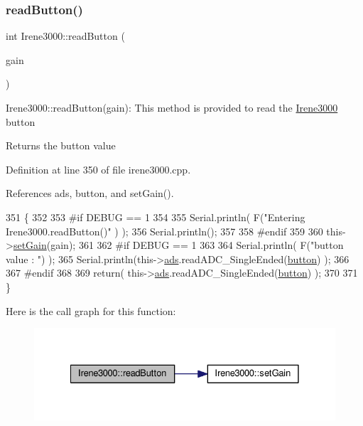 \subsubsection{\texorpdfstring{read\+Button()}{readButton()}}
{\footnotesize\ttfamily int Irene3000\+::read\+Button (\begin{DoxyParamCaption}\item[{ads\+Gain\+\_\+t}]{gain }\end{DoxyParamCaption})}

Irene3000\+::read\+Button(gain)\+: This method is provided to read the \hyperlink{classIrene3000}{Irene3000} button

\begin{DoxyReturn}{Returns}
the button value 
\end{DoxyReturn}


Definition at line 350 of file irene3000.\+cpp.



References ads, button, and set\+Gain().


\begin{DoxyCode}
351 \{
352 
353 \textcolor{preprocessor}{#if DEBUG == 1 }
354 
355     Serial.println( F(\textcolor{stringliteral}{"Entering Irene3000.readButton()"} ) );
356     Serial.println();
357 
358 \textcolor{preprocessor}{#endif }
359 
360     this->\hyperlink{classIrene3000_aff7c5da186b388e7272e63ff88a20c34}{setGain}(gain);
361 
362 \textcolor{preprocessor}{#if DEBUG == 1}
363     
364     Serial.println( F(\textcolor{stringliteral}{"button value : "}) );
365     Serial.println(this->\hyperlink{classIrene3000_a1215e77ba761c9908d80d691f149e135}{ads}.readADC\_SingleEnded(\hyperlink{Irene3000_8h_a37976ee6fe1fb8546bfd6153b83ffa6c}{button}) );
366 
367 \textcolor{preprocessor}{#endif }
368 
369     \textcolor{keywordflow}{return}( this->\hyperlink{classIrene3000_a1215e77ba761c9908d80d691f149e135}{ads}.readADC\_SingleEnded(\hyperlink{Irene3000_8h_a37976ee6fe1fb8546bfd6153b83ffa6c}{button}) );
370     
371 \}
\end{DoxyCode}
Here is the call graph for this function\+:\nopagebreak
\begin{figure}[H]
\begin{center}
\leavevmode
\includegraphics[width=328pt]{classIrene3000_ae0e0a5b773c3625b44c1d113c76a1540_cgraph}
\end{center}
\end{figure}
\mbox{\label{classIrene3000_abf3db725fabb0634ec889b32068a5eec}} 
